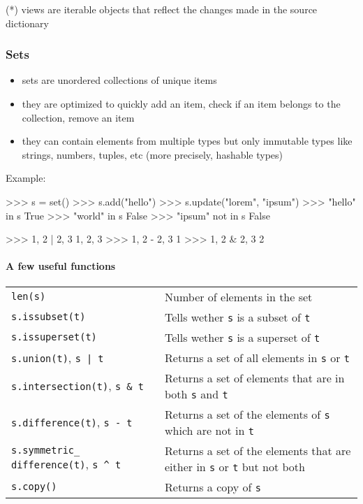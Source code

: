 \documentclass[twocolumn]{article}
\let\oldparagraph\paragraph
\renewcommand{\paragraph}[1]{\oldparagraph{#1}\mbox{}}
\begin{document}
(*) views are iterable objects that reflect the changes made in the source dictionary

\subsubsection{Sets}\label{sets}

\begin{itemize}
\item sets are unordered collections of unique items
\item they are optimized to quickly add an item, check if an item belongs to the collection, remove an item
\item they can contain elements from multiple types but only immutable types like strings, numbers, tuples, etc (more precisely, hashable types)
\end{itemize}

Example:
\begin{python}
>>> s = set()
>>> s.add("hello")
>>> s.update({"lorem", "ipsum"})
>>> "hello" in s
True
>>> "world" in s
False
>>> "ipsum" not in s
False
\end{python}

\begin{python}
>>> {1, 2} | {2, 3}
{1, 2, 3}
>>> {1, 2} - {2, 3}
{1}
>>> {1, 2} & {2, 3}
{2}
\end{python}

\paragraph{A few useful functions}\label{setusefulfunc}

\begin{tabular}{|p{3.25cm}|p{5cm}|}
\hline
\texttt{len(s)} & Number of elements in the set \\
\texttt{s.issubset(t)} & Tells wether \texttt{s} is a subset of \texttt{t} \\
\texttt{s.issuperset(t)} & Tells wether \texttt{s} is a superset of \texttt{t} \\
\texttt{s.union(t)}, \texttt{s~|~t} & Returns a set of all elements in \texttt{s} or \texttt{t} \\
\texttt{s.intersection(t)}, \texttt{s~\&~t} & Returns a set of elements that are in both \texttt{s} and \texttt{t} \\
\texttt{s.difference(t)}, \texttt{s~-~t} & Returns a set of the elements of \texttt{s} which are not in \texttt{t} \\
\texttt{s.symmetric\_ difference(t)}, \texttt{s~\^{}~t} & Returns a set of the elements that are either in \texttt{s} or \texttt{t} but not both \\
\texttt{s.copy()} & Returns a copy of \texttt{s} \\ \hline
\end{tabular}
\end{document}
